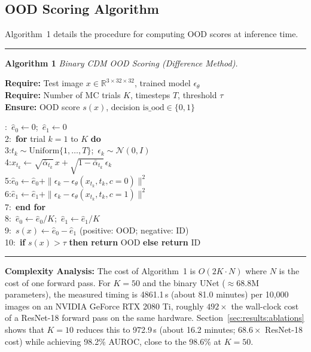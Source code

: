 \subsection{OOD Scoring Algorithm}
\label{sec:meth:problem:algorithm}

Algorithm~1 details the procedure for computing OOD scores at inference time.

\medskip
\noindent\rule{\textwidth}{0.4pt}
\smallskip
\begin{minipage}{\linewidth}\small\sloppy
\noindent\textbf{Algorithm 1} \emph{Binary CDM OOD Scoring (Difference Method).}\label{alg:ood_evaluation}

\noindent\textbf{Require:} Test image $x \in \mathbb{R}^{3 \times 32 \times 32}$, trained model $\epsilon_\theta$\\
\textbf{Require:} Number of MC trials $K$, timesteps $T$, threshold $\tau$\\
\textbf{Ensure:} OOD score $s(x)$, decision $\text{is\_ood} \in \{0, 1\}$

:\ $\hat{e}_0 \leftarrow 0$;\ $\hat{e}_1 \leftarrow 0$\\
2:\ \textbf{for} trial $k = 1$ to $K$ \textbf{do}\\
3:\quad $t_k \sim \text{Uniform}\{1, \ldots, T\}$;\ $\epsilon_k \sim \mathcal{N}(0, I)$\\
4:\quad $x_{t_k} \leftarrow \sqrt{\bar{\alpha}_{t_k}}\, x + \sqrt{1 - \bar{\alpha}_{t_k}}\, \epsilon_k$\\
5:\quad $\hat{e}_0 \leftarrow \hat{e}_0 + \|\epsilon_k - \epsilon_\theta(x_{t_k}, t_k, c{=}0)\|^2$\\
6:\quad $\hat{e}_1 \leftarrow \hat{e}_1 + \|\epsilon_k - \epsilon_\theta(x_{t_k}, t_k, c{=}1)\|^2$\\
7:\ \textbf{end for}\\
8:\ $\hat{e}_0 \leftarrow \hat{e}_0 / K$;\ $\hat{e}_1 \leftarrow \hat{e}_1 / K$\\
9:\ $s(x) \leftarrow \hat{e}_0 - \hat{e}_1$ (positive: OOD; negative: ID)\\
10:\ \textbf{if} $s(x) > \tau$ \textbf{then return} OOD \textbf{else return} ID
\end{minipage}
\smallskip
\noindent\rule{\textwidth}{0.4pt}
\medskip

\textbf{Complexity Analysis:} The cost of Algorithm~1 is $O(2K \cdot N)$ where $N$ is the cost of one forward pass. For $K = 50$ and the binary UNet (${\approx}68.8$M parameters), the measured timing is 4861.1\,s (about 81.0 minutes) per 10{,}000 images on an NVIDIA GeForce RTX 2080 Ti, roughly $492\times$ the wall-clock cost of a ResNet-18 forward pass on the same hardware. Section~\ref{sec:results:ablations} shows that $K = 10$ reduces this to 972.9\,s (about 16.2 minutes; $68.6\times$ ResNet-18 cost) while achieving 98.2\% AUROC, close to the 98.6\% at $K = 50$.

